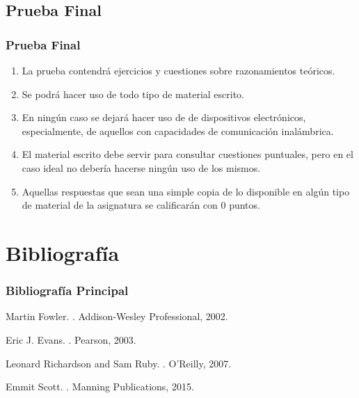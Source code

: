 \documentclass[a4paper,t,xcolor=pst,colortheme]{beamer}
\begin{document}
\subsection{Prueba Final}

\begin{frame}[c]
    \frametitle{Prueba Final}
	\begin{enumerate}[<+->]
		\item La prueba contendrá ejercicios y cuestiones sobre razonamientos teóricos.
        \item Se podrá hacer uso de todo tipo de material escrito.
        \item En ningún caso se dejará hacer uso de de dispositivos electrónicos, especialmente, de aquellos con capacidades de comunicación inalámbrica.
		\item \alert{El material escrito debe servir para consultar cuestiones puntuales, pero en el caso ideal no debería hacerse ningún uso de los mismos}.
		\item Aquellas respuestas que sean una simple copia de lo disponible en algún tipo de material de la asignatura se calificarán con 0 puntos.
	\end{enumerate}
\end{frame}

\section{Bibliografía}

\begin{frame}[c]
	\frametitle{Bibliografía Principal}
    \begin{thebibliography}{1}

Martin Fowler.
.
\newblock Addison-Wesley Professional, 2002.

Eric J. Evans.
.
\newblock Pearson, 2003.

Leonard Richardson and Sam Ruby.
.
\newblock  O'Reilly, 2007.

\bibitem{}
Emmit Scott.
.
\newblock  Manning Publications, 2015.

\end{thebibliography}
\end{frame}
\end{document}
